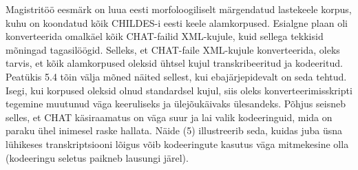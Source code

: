 \documentclass[12pt]{article}
\begin{document}
Magistritöö eesmärk on luua eesti morfoloogiliselt märgendatud lastekeele korpus, kuhu on koondatud kõik CHILDES-i eesti keele alamkorpused. Esialgne plaan oli konverteerida omalkäel kõik CHAT-failid XML-kujule, kuid sellega tekkisid mõningad tagasilöögid. Selleks, et CHAT-faile XML-kujule konverteerida, oleks tarvis, et kõik alamkorpused oleksid ühtsel kujul transkribeeritud ja kodeeritud. Peatükis 5.4 tõin välja mõned näited sellest, kui ebajärjepidevalt on seda tehtud. Isegi, kui korpused oleksid olnud standardsel kujul, siis oleks konverteerimisskripti tegemine muutunud väga keeruliseks ja ülejõukäivaks ülesandeks. Põhjus seisneb selles, et CHAT käsiraamatus on väga suur ja lai valik kodeeringuid, mida on paraku ühel inimesel raske hallata. Näide (5) illustreerib seda, kuidas juba üsna lühikeses transkriptsiooni lõigus võib kodeeringute kasutus väga mitmekesine olla (kodeeringu seletus paikneb lausungi järel).
\end{document}
